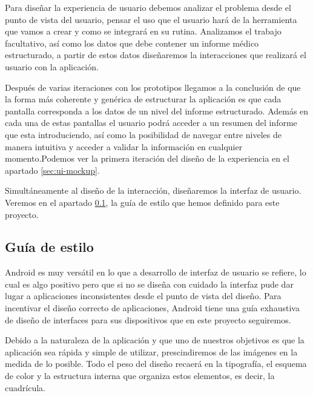 Para diseñar la experiencia de usuario debemos analizar el problema desde el punto de vista del usuario, pensar el uso que el usuario hará de la herramienta que vamos a crear y como se integrará en su rutina. Analizamos el trabajo facultativo, así como los datos que debe contener un informe médico estructurado, a partir de estos datos diseñaremos la interacciones que realizará el usuario con la aplicación.\par
Después de varias iteraciones con los prototipos llegamos a la conclusión de que la forma más coherente y genérica de estructurar la aplicación es que cada pantalla corresponda a los datos de un nivel del informe estructurado. Además en cada una de estas pantallas el usuario podrá acceder a un resumen del informe que esta introduciendo, así como la posibilidad de navegar entre niveles de manera intuitiva y acceder a validar la información en cualquier momento.Podemos ver la primera iteración del diseño de la experiencia en el apartado \ref{sec:ui-mockup}.\medskip\par

Simultáneamente al diseño de la interacción, diseñaremos la interfaz de usuario.
Veremos en el apartado \ref{sec:estilo}, la guía de estilo que hemos definido para este proyecto.\par

\subsection{Guía de estilo}\label{sec:estilo}

Android es muy versátil en lo que a desarrollo de interfaz de usuario se refiere, lo cual es algo positivo pero que si no se diseña con cuidado la interfaz pude dar lugar a aplicaciones inconsistentes desde el punto de vista del diseño. Para incentivar el diseño correcto de aplicaciones, Android tiene una guía exhaustiva de diseño de interfaces para sus dispositivos \cite{android:design} que en este proyecto seguiremos. \par

Debido a la naturaleza de la aplicación y que uno de nuestros objetivos es que la aplicación sea rápida y simple de utilizar, prescindiremos de las imágenes en la medida de lo posible. Todo el peso del diseño recaerá en la tipografía, el esquema de color y la estructura interna que organiza estos elementos, es decir, la cuadrícula.\par
